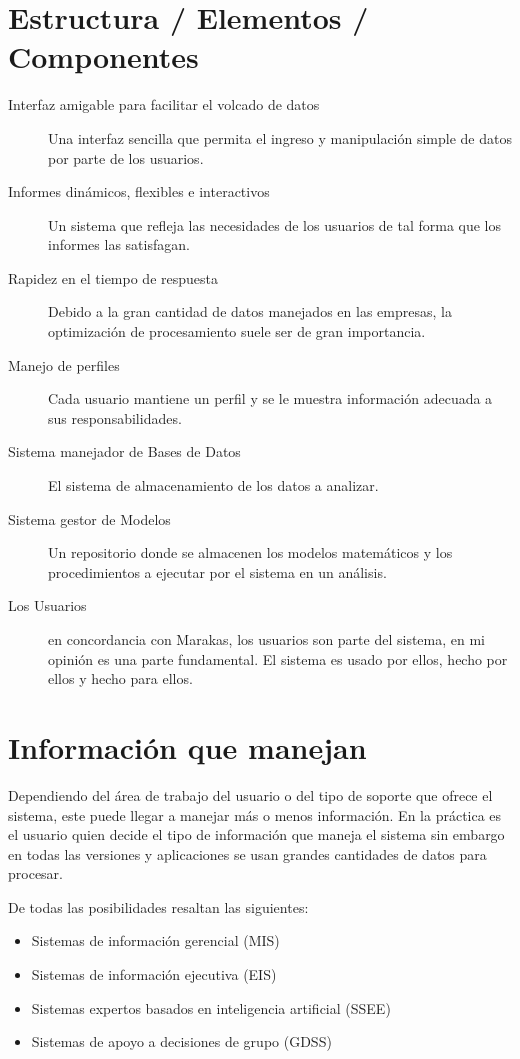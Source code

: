 \section {Estructura / Elementos / Componentes}
\begin{description}
\item [Interfaz amigable para facilitar el volcado de datos]
Una interfaz sencilla que permita el ingreso y manipulación simple de datos por parte de los usuarios.
\item [Informes dinámicos, flexibles e interactivos]
Un sistema que refleja las necesidades de los usuarios de tal forma que los informes las satisfagan.
\item [Rapidez en el tiempo de respuesta]
Debido a la gran cantidad de datos manejados en las empresas, la optimización de procesamiento suele ser de gran importancia.
\item [Manejo de perfiles]
Cada usuario mantiene un perfil y se le muestra información adecuada a sus responsabilidades.
\item [Sistema manejador de Bases de Datos]
El sistema de almacenamiento de los datos a analizar.
\item [Sistema gestor de Modelos]
Un repositorio donde se almacenen los modelos matemáticos y los procedimientos a ejecutar por el sistema en un análisis.
\item [Los Usuarios]
en concordancia con Marakas, los usuarios son parte del sistema, en mi opinión es una parte fundamental. El sistema es usado por ellos, hecho por ellos y hecho para ellos.
\end{description}

\section {Información que manejan}
Dependiendo del área de trabajo del usuario o del tipo de soporte que ofrece el sistema, este puede llegar a manejar más o menos información. En la práctica es el usuario quien decide el tipo de información que maneja el sistema sin embargo en todas las versiones y aplicaciones se usan grandes cantidades de datos para procesar.

De todas las posibilidades resaltan las siguientes:
\begin{itemize}
\item Sistemas de información gerencial (MIS)
\item Sistemas de información ejecutiva (EIS)
\item Sistemas expertos basados en inteligencia artificial (SSEE)
\item Sistemas de apoyo a decisiones de grupo (GDSS)
\end{itemize}

